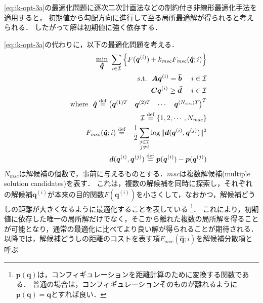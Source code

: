 \eqref{eq:ik-opt-3a}の最適化問題に逐次二次計画法などの制約付き非線形最適化手法を適用すると，
初期値から勾配方向に進行して至る局所最適解が得られると考えられる．
したがって解は初期値に強く依存する．

\eqref{eq:ik-opt-3a}の代わりに，以下の最適化問題を考える．
\begin{eqnarray}
  &&\min_{\mbox{\boldmath{$\hat{q}$}}} \ \sum_{i \in \mathcal{I}} \left\{ F(\mbox{\boldmath{$q$}}^{(i)}) + k_{\mathit{msc}} F_{\mathit{msc}}(\mbox{\boldmath{$\hat{q}$}}; i) \right\} \label{eq:solution-candidate-opt} \\
  &&{\rm s.t.} \ \  \mbox{\boldmath{$A$}} \mbox{\boldmath{$q$}}^{(i)} = \mbox{\boldmath{$\bar{b}$}} \ \ \ \ i \in \mathcal{I} \\
  &&\phantom{\rm s.t.} \ \  \mbox{\boldmath{$C$}} \mbox{\boldmath{$q$}}^{(i)} \geq \mbox{\boldmath{$\bar{d}$}} \ \ \ \ i \in \mathcal{I} \\
  &&{\rm where} \ \ \mbox{\boldmath{$\hat{q}$}} \stackrel{\mathrm{def}}{=} \begin{pmatrix} \mbox{\boldmath{$q$}}^{(1)T} & \mbox{\boldmath{$q$}}^{(2)T} & \cdots & \mbox{\boldmath{$q$}}^{(N_{\mathit{msc}})T} \end{pmatrix}^T \\
  &&\phantom{\rm where} \ \ \mathcal{I} \stackrel{\mathrm{def}}{=} \{ 1,2,\cdots,N_{\mathit{msc}} \} \\
  &&\phantom{\rm where} \ \ F_{\mathit{msc}}(\mbox{\boldmath{$\hat{q}$}}; i) \stackrel{\mathrm{def}}{=} - \frac{1}{2} \sum_{\substack{j \in \mathcal{I} \\ j \not= i}} \log \| \mbox{\boldmath{$d$}}(\mbox{\boldmath{$q$}}^{(i)}, \mbox{\boldmath{$q$}}^{(j)}) \|^2 \\
  &&\phantom{\rm where} \ \ \mbox{\boldmath{$d$}}(\mbox{\boldmath{$q$}}^{(i)}, \mbox{\boldmath{$q$}}^{(j)}) \stackrel{\mathrm{def}}{=} \mbox{\boldmath{$p$}}(\mbox{\boldmath{$q$}}^{(i)}) - \mbox{\boldmath{$p$}}(\mbox{\boldmath{$q$}}^{(j)})
\end{eqnarray}
$N_{\mathit{msc}}$は解候補の個数で，事前に与えるものとする．$\mathit{msc}$は複数解候補(multiple solution candidates)を表す．
これは，複数の解候補を同時に探索し，それぞれの解候補$\bm{q}^{(i)}$が本来の目的関数$F(\bm{q}^{(i)})$を小さくして，なおかつ，解候補どうしの距離が大きくなるように最適化することを表している
\footnote{$\bm{p}(\bm{q})$は，コンフィギュレーションを距離計算のために変換する関数である．
普通の場合は，コンフィギュレーションそのものが離れるように$\bm{p}(\bm{q})=\bm{q}$とすれば良い．}．
これにより，初期値に依存した唯一の局所解だけでなく，そこから離れた複数の局所解を得ることが可能となり，通常の最適化に比べてより良い解が得られることが期待される．
以降では，解候補どうしの距離のコストを表す項$F_{\mathit{msc}}(\bm{\hat{q}}; i)$を解候補分散項と呼ぶ
